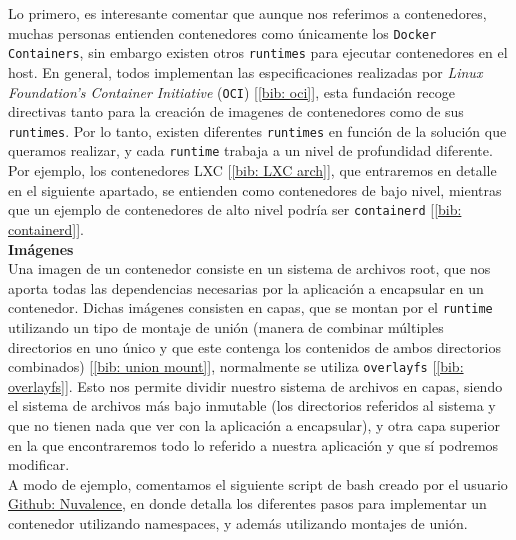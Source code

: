 \documentclass[12pt]{article}
\begin{document}
	\noindent Lo primero, es interesante comentar que aunque nos referimos a contenedores, muchas personas entienden contenedores como únicamente los \texttt{Docker Containers}, sin embargo existen otros \texttt{runtimes} para ejecutar contenedores en el host. En general, todos implementan las especificaciones realizadas por \textit{Linux Foundation's Container Initiative} (\texttt{OCI}) [\ref{bib: oci}], esta fundación recoge directivas tanto para la creación de imagenes de contenedores como de sus \texttt{runtimes}. Por lo tanto, existen diferentes \texttt{runtimes} en función de la solución que queramos realizar, y cada \texttt{runtime} trabaja a un nivel de profundidad diferente. Por ejemplo, los contenedores LXC [\ref{bib: LXC arch}], que entraremos en detalle en el siguiente apartado, se entienden como contenedores de bajo nivel, mientras que un ejemplo de contenedores de alto nivel podría ser \texttt{containerd} [\ref{bib: containerd}]. \\
	
	\noindent \textbf{\large Imágenes}\\
	
	\noindent Una imagen de un contenedor consiste en un sistema de archivos root, que nos aporta todas las dependencias necesarias por la aplicación a encapsular en un contenedor. Dichas imágenes consisten en capas, que se montan por el \texttt{runtime} utilizando un tipo de montaje de unión (manera de combinar múltiples directorios en uno único y que este contenga los contenidos de ambos directorios combinados) [\ref{bib: union mount}], normalmente se utiliza \texttt{overlayfs} [\ref{bib: overlayfs}]. Esto nos permite dividir nuestro sistema de archivos en capas, siendo el sistema de archivos más bajo inmutable (los directorios referidos al sistema y que no tienen nada que ver con la aplicación a encapsular), y otra capa superior en la que encontraremos todo lo referido a nuestra aplicación y que sí podremos modificar. \\
	
	\noindent A modo de ejemplo, comentamos el siguiente script de bash creado por el usuario \href{https://github.com/Nuvalence/diy-container}{Github: Nuvalence}, en donde detalla los diferentes pasos para implementar un contenedor utilizando namespaces, y además utilizando montajes de unión.
	
\end{document}
